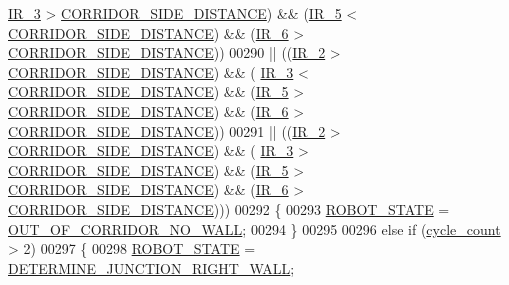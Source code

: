 \begin{DoxyCode}
      \hyperlink{state__machine_8c_a7831b71dc250258ecefe0e23f9920688}{IR\_3} > \hyperlink{state__machine_8c_a201d56046ddf552d57b4862e0ec07a10}{CORRIDOR\_SIDE\_DISTANCE}) && (\hyperlink{state__machine_8c_ad00ba6cc1cf461bda7059f5aafc06142}{IR\_5} < 
      \hyperlink{state__machine_8c_a201d56046ddf552d57b4862e0ec07a10}{CORRIDOR\_SIDE\_DISTANCE}) && (\hyperlink{state__machine_8c_a8c51bcd8b555e8c78fea79b88d28b55e}{IR\_6} > 
      \hyperlink{state__machine_8c_a201d56046ddf552d57b4862e0ec07a10}{CORRIDOR\_SIDE\_DISTANCE}))
00290              || ((\hyperlink{state__machine_8c_a07cfb2e201909d017a88a2a86c32cd4b}{IR\_2} > \hyperlink{state__machine_8c_a201d56046ddf552d57b4862e0ec07a10}{CORRIDOR\_SIDE\_DISTANCE}) && (
      \hyperlink{state__machine_8c_a7831b71dc250258ecefe0e23f9920688}{IR\_3} < \hyperlink{state__machine_8c_a201d56046ddf552d57b4862e0ec07a10}{CORRIDOR\_SIDE\_DISTANCE}) && (\hyperlink{state__machine_8c_ad00ba6cc1cf461bda7059f5aafc06142}{IR\_5} > 
      \hyperlink{state__machine_8c_a201d56046ddf552d57b4862e0ec07a10}{CORRIDOR\_SIDE\_DISTANCE}) && (\hyperlink{state__machine_8c_a8c51bcd8b555e8c78fea79b88d28b55e}{IR\_6} > 
      \hyperlink{state__machine_8c_a201d56046ddf552d57b4862e0ec07a10}{CORRIDOR\_SIDE\_DISTANCE}))
00291              || ((\hyperlink{state__machine_8c_a07cfb2e201909d017a88a2a86c32cd4b}{IR\_2} > \hyperlink{state__machine_8c_a201d56046ddf552d57b4862e0ec07a10}{CORRIDOR\_SIDE\_DISTANCE}) && (
      \hyperlink{state__machine_8c_a7831b71dc250258ecefe0e23f9920688}{IR\_3} > \hyperlink{state__machine_8c_a201d56046ddf552d57b4862e0ec07a10}{CORRIDOR\_SIDE\_DISTANCE}) && (\hyperlink{state__machine_8c_ad00ba6cc1cf461bda7059f5aafc06142}{IR\_5} > 
      \hyperlink{state__machine_8c_a201d56046ddf552d57b4862e0ec07a10}{CORRIDOR\_SIDE\_DISTANCE}) && (\hyperlink{state__machine_8c_a8c51bcd8b555e8c78fea79b88d28b55e}{IR\_6} > 
      \hyperlink{state__machine_8c_a201d56046ddf552d57b4862e0ec07a10}{CORRIDOR\_SIDE\_DISTANCE})))
00292             \{
00293                 \hyperlink{state__machine_8h_a5e5321a4a9085b83c8161454bf7a145c}{ROBOT\_STATE} = \hyperlink{state__machine_8h_a94b1da2e055fff4d143aa6aa891f79a9a24fb9d9ff0b7ac346a2527509a251125}{OUT\_OF\_CORRIDOR\_NO\_WALL};
00294             \}
00295             
00296             \textcolor{keywordflow}{else} \textcolor{keywordflow}{if} (\hyperlink{state__machine_8c_a937f74a65988b9e22241ab3765b82c50}{cycle\_count} > 2)
00297             \{
00298                 \hyperlink{state__machine_8h_a5e5321a4a9085b83c8161454bf7a145c}{ROBOT\_STATE} = \hyperlink{state__machine_8h_a94b1da2e055fff4d143aa6aa891f79a9a70c5928783e4499f7b546a5a33f836c7}{DETERMINE\_JUNCTION\_RIGHT\_WALL};

\end{DoxyCode}
